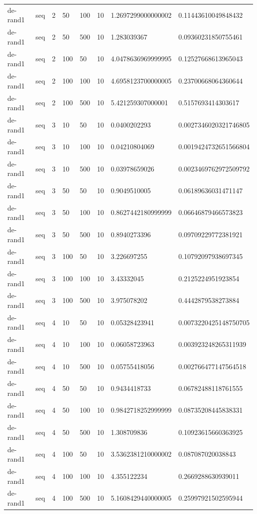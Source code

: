 \begin{table}[t]
\begin{tabular}{llllllll}
de-rand1 & seq & 2 & 50 & 100 & 10 & 1.2697299000000002 & 0.11443610049848432 \\
de-rand1 & seq & 2 & 50 & 500 & 10 & 1.283039367 & 0.09360231850755461 \\
de-rand1 & seq & 2 & 100 & 50 & 10 & 4.0478636969999995 & 0.12527668613965043 \\
de-rand1 & seq & 2 & 100 & 100 & 10 & 4.6958123700000005 & 0.23700668064360644 \\
de-rand1 & seq & 2 & 100 & 500 & 10 & 5.421259307000001 & 0.5157693414303617 \\
de-rand1 & seq & 3 & 10 & 50 & 10 & 0.0400202293 & 0.0027346020321746805 \\
de-rand1 & seq & 3 & 10 & 100 & 10 & 0.04210804069 & 0.0019424732651566804 \\
de-rand1 & seq & 3 & 10 & 500 & 10 & 0.03978659026 & 0.0023469762972509792 \\
de-rand1 & seq & 3 & 50 & 50 & 10 & 0.9049510005 & 0.06189636031471147 \\
de-rand1 & seq & 3 & 50 & 100 & 10 & 0.8627442180999999 & 0.06646879466573823 \\
de-rand1 & seq & 3 & 50 & 500 & 10 & 0.8940273396 & 0.09709229772381921 \\
de-rand1 & seq & 3 & 100 & 50 & 10 & 3.226697255 & 0.10792097938697345 \\
de-rand1 & seq & 3 & 100 & 100 & 10 & 3.43332045 & 0.2125224951923854 \\
de-rand1 & seq & 3 & 100 & 500 & 10 & 3.975078202 & 0.4442879538273884 \\
de-rand1 & seq & 4 & 10 & 50 & 10 & 0.05328423941 & 0.0073220425148750705 \\
de-rand1 & seq & 4 & 10 & 100 & 10 & 0.06058723963 & 0.003923248265311939 \\
de-rand1 & seq & 4 & 10 & 500 & 10 & 0.05755418056 & 0.002766477147564518 \\
de-rand1 & seq & 4 & 50 & 50 & 10 & 0.9434418733 & 0.06782488118761555 \\
de-rand1 & seq & 4 & 50 & 100 & 10 & 0.9842718252999999 & 0.08735208445838331 \\
de-rand1 & seq & 4 & 50 & 500 & 10 & 1.308709836 & 0.10923615660363925 \\
de-rand1 & seq & 4 & 100 & 50 & 10 & 3.5362381210000002 & 0.087087020038843 \\
de-rand1 & seq & 4 & 100 & 100 & 10 & 4.355122234 & 0.2669288630939011 \\
de-rand1 & seq & 4 & 100 & 500 & 10 & 5.1608429440000005 & 0.25997921502595944 \\

\end{tabular}
\end{table}

